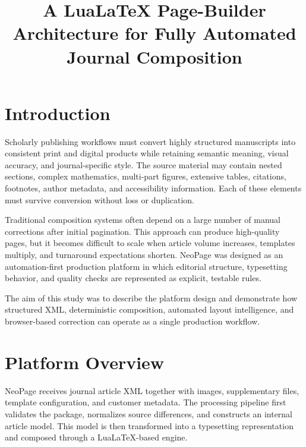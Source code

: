 \documentclass{tnqjournal}
\title{A LuaLaTeX Page-Builder Architecture for Fully Automated Journal Composition}
\begin{document}
\maketitle

\section{Introduction}
Scholarly publishing workflows must convert highly structured manuscripts into consistent print and digital products while retaining semantic meaning, visual accuracy, and journal-specific style. The source material may contain nested sections, complex mathematics, multi-part figures, extensive tables, citations, footnotes, author metadata, and accessibility information. Each of these elements must survive conversion without loss or duplication.

Traditional composition systems often depend on a large number of manual corrections after initial pagination. This approach can produce high-quality pages, but it becomes difficult to scale when article volume increases, templates multiply, and turnaround expectations shorten. NeoPage was designed as an automation-first production platform in which editorial structure, typesetting behavior, and quality checks are represented as explicit, testable rules.

The aim of this study was to describe the platform design and demonstrate how structured XML, deterministic composition, automated layout intelligence, and browser-based correction can operate as a single production workflow.

\section{Platform Overview}
NeoPage receives journal article XML together with images, supplementary files, template configuration, and customer metadata. The processing pipeline first validates the package, normalizes source differences, and constructs an internal article model. This model is then transformed into a typesetting representation and composed through a LuaLaTeX-based engine.
\end{document}
